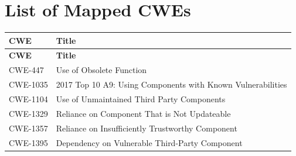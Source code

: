\documentclass[11pt]{article}
\begin{document}
\newpage
\section{List of Mapped CWEs}
\renewcommand{\arraystretch}{1.1}
\begin{longtable}{@{}p{2.4cm}p{12.0cm}@{}}
\toprule
\textbf{CWE} & \textbf{Title} \\
\midrule
\endfirsthead
\toprule
\textbf{CWE} & \textbf{Title} \\
\midrule
\endhead
\bottomrule
\endfoot

CWE-447  & Use of Obsolete Function \\
CWE-1035 & 2017 Top 10 A9: Using Components with Known Vulnerabilities \\
CWE-1104 & Use of Unmaintained Third Party Components \\
CWE-1329 & Reliance on Component That is Not Updateable \\
CWE-1357 & Reliance on Insufficiently Trustworthy Component \\
CWE-1395 & Dependency on Vulnerable Third-Party Component \\

\end{longtable}
\end{document}
